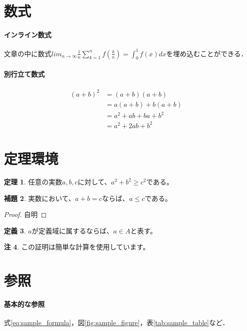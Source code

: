 \documentclass[dvipdfmx]{jsarticle} %
\theoremstyle{definition} %
\newtheorem{theorem}{定理}[section]
\newtheorem{lemma}[theorem]{補題}
\newtheorem{definition}[theorem]{定義}
\newtheorem{remark}[theorem]{注}
\begin{document}
\section{数式}
\paragraph{インライン数式}
文章の中に数式$\displaystyle lim_{n \to \infty} \frac{1}{n} \sum^{n}_{k=1} f \left( \frac{k}{n} \right) = \int^{1}_{0} f(x)dx$を埋め込むことができる．

\paragraph{別行立て数式}
\begin{align}
  (a+b)^2 &= (a+b)(a+b)    \\
          &= a(a+b)+b(a+b) \\
          &= a^2+ab+ba+b^2 \\
          &= a^2+2ab+b^2 \label{eq:sample_formula}
\end{align}

\section{定理環境}
\begin{theorem}
任意の実数\( a, b, c \)に対して、\( a^2 + b^2 \geq c^2 \)である。
\end{theorem}

\begin{lemma}
実数において、\( a + b = c \)ならば、\( a \leq c \)である。
\end{lemma}

\begin{proof}
  自明
\end{proof}

\begin{definition}
\( a \)が定義域に属するならば、\( a \in A \)と表す。
\end{definition}

\begin{remark}
この証明は簡単な計算を使用しています。
\end{remark}

\section{参照}
\paragraph{基本的な参照}
式\ref{eq:sample_formula}，図\ref{fig:sample_figure}，表\ref{tab:sample_table}など．
\end{document}
